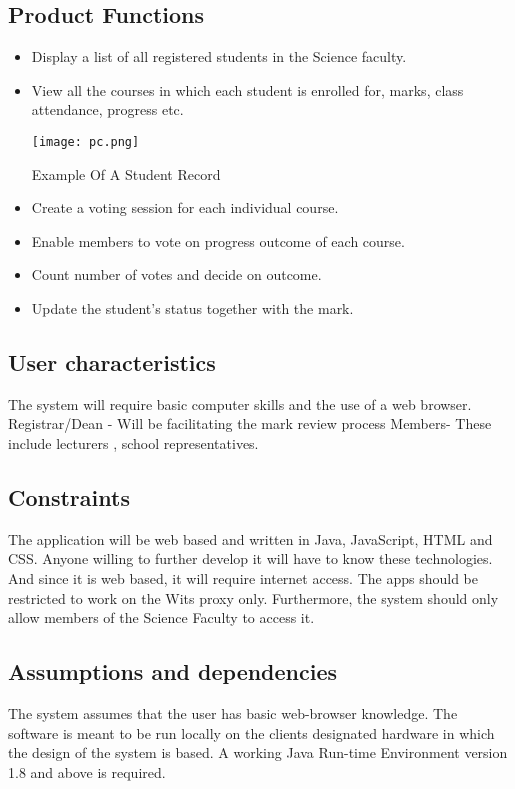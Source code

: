 \documentclass{article}
\begin{document}
\subsection{Product Functions}



\begin{itemize}
    \item \large {Display a list of all registered students in the Science faculty.}
    \item \large {View all the courses in which each student is enrolled for, marks, class attendance, progress etc.}
    
        
        \texttt{[image: pc.png]}
        \caption{Example Of A Student Record }
        
    
    \item \large {Create a voting session for each individual course.}
    \item \large {Enable members to vote on progress outcome of each course.}
    \item \large {Count number of votes and decide on outcome.}
    \item \large {Update the student's status together with the mark.}
\end{itemize}


\subsection{User characteristics}
\large{The system will require basic computer skills and the use of a web browser. Registrar/Dean - Will be facilitating the mark review process
Members- These include lecturers , school representatives.}

\subsection{Constraints}

\large{The application will be web based and written in Java, JavaScript, HTML and CSS. Anyone willing to further develop it will
have to know these technologies. 
And since it is web based, it will require internet access. The apps should be restricted to work on the Wits proxy only.
Furthermore, the system should only allow members of the Science Faculty to access it.}

\subsection{Assumptions and dependencies}

\large{The system assumes that the user has basic web-browser knowledge. The software is meant to be run locally on the clients designated hardware in which the design of the system is based. A working Java Run-time Environment version 1.8 and above is required.}
\end{document}
